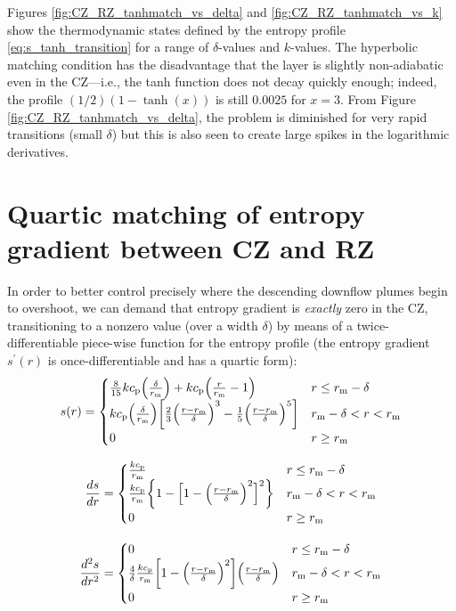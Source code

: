 \documentclass[12pt]{article} %
\newcommand{\rrm}{r_{\rm{m}}}
\begin{document}
Figures \ref{fig:CZ_RZ_tanhmatch_vs_delta} and \ref{fig:CZ_RZ_tanhmatch_vs_k} show the thermodynamic states defined by the entropy profile \eqref{eq:s_tanh_transition} for a range of $\delta$-values and $k$-values. The hyperbolic matching condition has the disadvantage that the layer is slightly non-adiabatic even in the CZ---i.e., the tanh function does not decay quickly enough; indeed, the profile $(1/2)(1-\tanh(x))$ is still $0.0025$ for $x=3$. From Figure \ref{fig:CZ_RZ_tanhmatch_vs_delta}, the problem is diminished for very rapid transitions (small $\delta$) but this is also seen to create large spikes in the logarithmic derivatives. 

\section{Quartic matching of entropy gradient between CZ and RZ}
 In order to better control precisely where the descending downflow plumes begin to overshoot, we can demand that entropy gradient is \textit{exactly} zero in the CZ, transitioning to a nonzero value (over a width $\delta$) by means of a twice-differentiable piece-wise function for the entropy profile (the entropy gradient $s^\prime(r)$ is once-differentiable and has a quartic form):
\begin{equation}\label{eq:s_quart_transition}
s(r) = \begin{cases}
\frac{8}{15}k\cp\Big{(}\frac{\delta}{\rrm}\Big{)} + k\cp\Big{(}\frac{r}{\rrm} - 1\Big{)} &r\leq \rrm - \delta\\
k\cp\Big{(}\frac{\delta}{\rrm}\Big{)}\bigg{[}\frac{2}{3}\Big{(}\frac{r-\rrm}{\delta}\Big{)}^3 - \frac{1}{5} \Big{(}\frac{r-\rrm}{\delta}\Big{)}^5\bigg{]} & \rrm - \delta < r < \rrm\\
0 & r\geq \rrm
\end{cases}
\end{equation}

\begin{equation}\label{eq:dsdr_quart_transition}
\frac{ds}{dr} = \begin{cases}
\frac{k\cp}{\rrm} & r\leq \rrm - \delta\\
\frac{k\cp}{\rrm}\bigg{\{}1 - \Big{[}1 - \Big{(}\frac{r-\rrm}{\delta}\Big{)}^2\Big{]}^2\bigg{\}} & \rrm - \delta < r < \rrm\\
0 & r\geq \rrm
\end{cases}
\end{equation}

\begin{equation}\label{eq:d2sdr2_quart_transition}
\frac{d^2s}{dr^2} = \begin{cases}
0 & r\leq \rrm - \delta\\
\frac{4}{\delta}\frac{k\cp}{\rrm}\bigg{[}1 - \Big{(}\frac{r-\rrm}{\delta}\Big{)}^2\bigg{]}\Big{(}\frac{r-\rrm}{\delta}\Big{)} & \rrm - \delta < r < \rrm\\
0 & r\geq \rrm
\end{cases}
\end{equation}
\end{document}
